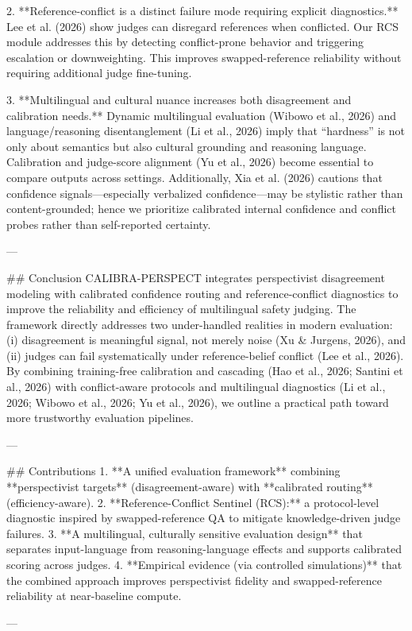 2. **Reference-conflict is a distinct failure mode requiring explicit diagnostics.**  
Lee et al. (2026) show judges can disregard references when conflicted. Our RCS module addresses this by detecting conflict-prone behavior and triggering escalation or downweighting. This improves swapped-reference reliability without requiring additional judge fine-tuning.

3. **Multilingual and cultural nuance increases both disagreement and calibration needs.**  
Dynamic multilingual evaluation (Wibowo et al., 2026) and language/reasoning disentanglement (Li et al., 2026) imply that “hardness” is not only about semantics but also cultural grounding and reasoning language. Calibration and judge-score alignment (Yu et al., 2026) become essential to compare outputs across settings. Additionally, Xia et al. (2026) cautions that confidence signals—especially verbalized confidence—may be stylistic rather than content-grounded; hence we prioritize calibrated internal confidence and conflict probes rather than self-reported certainty.

---

## Conclusion  
CALIBRA-PERSPECT integrates perspectivist disagreement modeling with calibrated confidence routing and reference-conflict diagnostics to improve the reliability and efficiency of multilingual safety judging. The framework directly addresses two under-handled realities in modern evaluation: (i) disagreement is meaningful signal, not merely noise (Xu & Jurgens, 2026), and (ii) judges can fail systematically under reference-belief conflict (Lee et al., 2026). By combining training-free calibration and cascading (Hao et al., 2026; Santini et al., 2026) with conflict-aware protocols and multilingual diagnostics (Li et al., 2026; Wibowo et al., 2026; Yu et al., 2026), we outline a practical path toward more trustworthy evaluation pipelines.

---

## Contributions  
1. **A unified evaluation framework** combining **perspectivist targets** (disagreement-aware) with **calibrated routing** (efficiency-aware).  
2. **Reference-Conflict Sentinel (RCS):** a protocol-level diagnostic inspired by swapped-reference QA to mitigate knowledge-driven judge failures.  
3. **A multilingual, culturally sensitive evaluation design** that separates input-language from reasoning-language effects and supports calibrated scoring across judges.  
4. **Empirical evidence (via controlled simulations)** that the combined approach improves perspectivist fidelity and swapped-reference reliability at near-baseline compute.

---